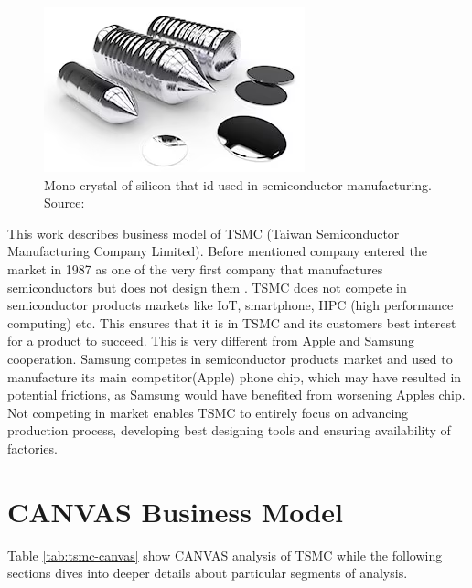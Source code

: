 \documentclass[a4paper,12pt]{article}
\begin{document}
\begin{figure}
    \includegraphics[width=0.9\linewidth]{monocrystal_silicon.png}
    \caption{Mono-crystal of silicon that id used in semiconductor manufacturing. Source: \cite{hitachiHightechManufactering}}
    \label{img:monocrystal-silicon}
\end{figure}


This work describes business model of TSMC (Taiwan Semiconductor Manufacturing Company Limited).
Before mentioned company entered the market in 1987 as one of the very first company that manufactures semiconductors but does not design them \cite{TSMCwebCompanyProfile}.
TSMC does not compete in  semiconductor products markets like IoT, smartphone, HPC (high performance computing) etc.
This ensures that it is in TSMC and its customers best interest for a product to succeed.
This is very different from Apple and Samsung cooperation.
Samsung competes in semiconductor products market and used to manufacture its main competitor(Apple) phone chip, which may have resulted in potential frictions, as Samsung would have benefited from worsening Apples chip.
Not competing in market enables TSMC to entirely focus on advancing production process, developing best designing tools and ensuring availability of factories. 

\tableofcontents




\section{CANVAS Business Model}
Table \ref{tab:tsmc-canvas} show CANVAS analysis of TSMC while the following sections dives into deeper details about particular segments of analysis.  

\end{document}
